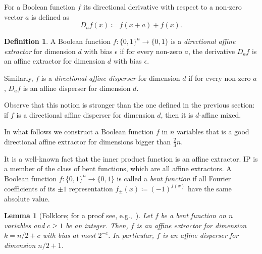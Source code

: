 \documentclass[a4paper,11pt,draft]{article}
\newtheorem{lemma}[theorem]{Lemma}
\theoremstyle{definition}
\newtheorem{definition}[theorem]{Definition}
\theoremstyle{remark}
\newcommand{\Q}{{\{0,1\}}}
\begin{document}
For a Boolean function $f$ its directional derivative with respect to a non-zero vector $a$ is defined as
\[
  D_{a} f(x) \coloneqq f(x+a) + f(x).
\]

\begin{definition}
  A Boolean function $f\colon \Q^n \to \Q$ is a \emph{directional affine extractor} for dimension $d$ with bias $\epsilon$ if for every non-zero $a$, the derivative $D_a f$ is an affine extractor for dimension $d$ with bias $\epsilon$.

  Similarly, $f$ is a \emph{directional affine disperser} for dimension $d$ if for every non-zero $a$, $D_a f$ is an affine disperser for dimension $d$.
\end{definition}

Observe that this notion is stronger than the one defined in the previous section: if $f$ is a directional affine disperser for dimension $d$, then it is $d$-affine mixed. 

%
%
%

%
%
%
%
%
%
%
%
%
%
%

In what follows we construct a Boolean function $f$ in $n$ variables that is a good directional affine extractor for dimensions bigger than $\frac{2}{3}n$.


%
%
%
%

It is a well-known fact that the inner product function is an affine extractor. IP is a member of the class of bent functions, which are all affine extractors. A Boolean function $f\colon \Q^n \to \Q$ is called a \emph{bent function} if all Fourier coefficients of its $\pm 1$ representation $f_\pm(x) \coloneqq {(-1)}^{f(x)}$ have the same absolute value.
%
%

\begin{lemma}[Folklore; for a proof see, e.g.,~\cite{DBLP:conf/innovations/CohenS16,DBLP:journals/jcss/CheraghchiGJWX18}]
\label{lm:bent}
  Let $f$ be a bent function on $n$ variables and $c \ge 1$ be an integer. Then, $f$ is an affine extractor for dimension $k = n/2 + c$ with bias at most $2^{-c}$. In particular, $f$ is an affine disperser for dimension $n/2 + 1$.
\end{lemma}
\end{document}
